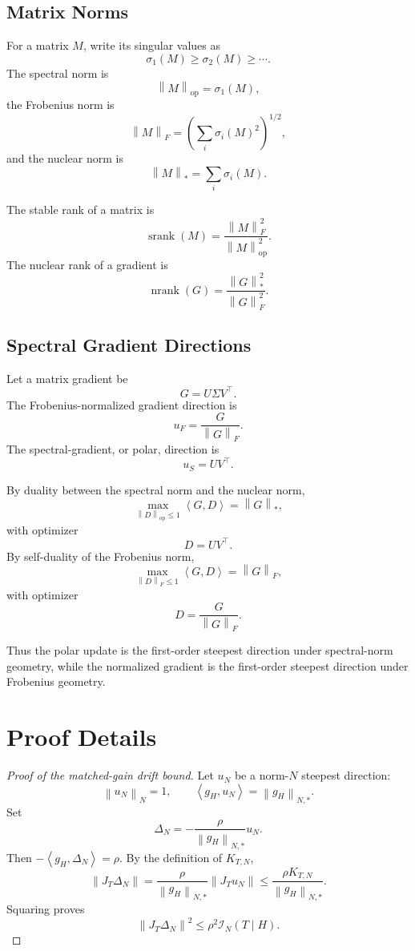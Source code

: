 \documentclass{article}
\theoremstyle{definition}
\newcommand{\I}{\mathcal I}
\newcommand{\op}{\mathrm{op}}
\newcommand{\norm}[1]{\left\lVert #1 \right\rVert}
\newcommand{\inner}[2]{\left\langle #1,#2 \right\rangle}
\newcommand{\srank}{\operatorname{srank}}
\newcommand{\nrank}{\operatorname{nrank}}
\begin{document}
\subsection{Matrix Norms}

For a matrix \(M\), write its singular values as
\[
\sigma_1(M)\ge \sigma_2(M)\ge\cdots.
\]
The spectral norm is
\[
\norm{M}_{\op}=\sigma_1(M),
\]
the Frobenius norm is
\[
\norm{M}_F=\left(\sum_i\sigma_i(M)^2\right)^{1/2},
\]
and the nuclear norm is
\[
\norm{M}_*=\sum_i\sigma_i(M).
\]

The stable rank of a matrix is
\[
\srank(M)=\frac{\norm{M}_F^2}{\norm{M}_{\op}^2}.
\]
The nuclear rank of a gradient is
\[
\nrank(G)=\frac{\norm{G}_*^2}{\norm{G}_F^2}.
\]

\subsection{Spectral Gradient Directions}

Let a matrix gradient be
\[
G=U\Sigma V^\top.
\]
The Frobenius-normalized gradient direction is
\[
u_F=\frac{G}{\norm{G}_F}.
\]
The spectral-gradient, or polar, direction is
\[
u_S=UV^\top.
\]

By duality between the spectral norm and the nuclear norm,
\[
\max_{\norm{D}_{\op}\le 1}\inner{G}{D}=\norm{G}_*,
\]
with optimizer
\[
D=UV^\top.
\]
By self-duality of the Frobenius norm,
\[
\max_{\norm{D}_F\le 1}\inner{G}{D}=\norm{G}_F,
\]
with optimizer
\[
D=\frac{G}{\norm{G}_F}.
\]

Thus the polar update is the first-order steepest direction under spectral-norm geometry, while the normalized gradient is the first-order steepest direction under Frobenius geometry.

\section{Proof Details}
\label{app:proof-details}

\begin{proof}[Proof of the matched-gain drift bound]
Let \(u_N\) be a norm-\(N\) steepest direction:
\[
\norm{u_N}_N=1,
\qquad
\inner{g_H}{u_N}=\norm{g_H}_{N,*}.
\]
Set
\[
\Delta_N=-\frac{\rho}{\norm{g_H}_{N,*}}u_N.
\]
Then \(-\inner{g_H}{\Delta_N}=\rho\). By the definition of \(K_{T,N}\),
\[
\norm{J_T\Delta_N}
=
\frac{\rho}{\norm{g_H}_{N,*}}\norm{J_Tu_N}
\le
\frac{\rho K_{T,N}}{\norm{g_H}_{N,*}}.
\]
Squaring proves
\[
\norm{J_T\Delta_N}^2\le \rho^2\I_N(T\mid H).
\]
\end{proof}
\end{document}
